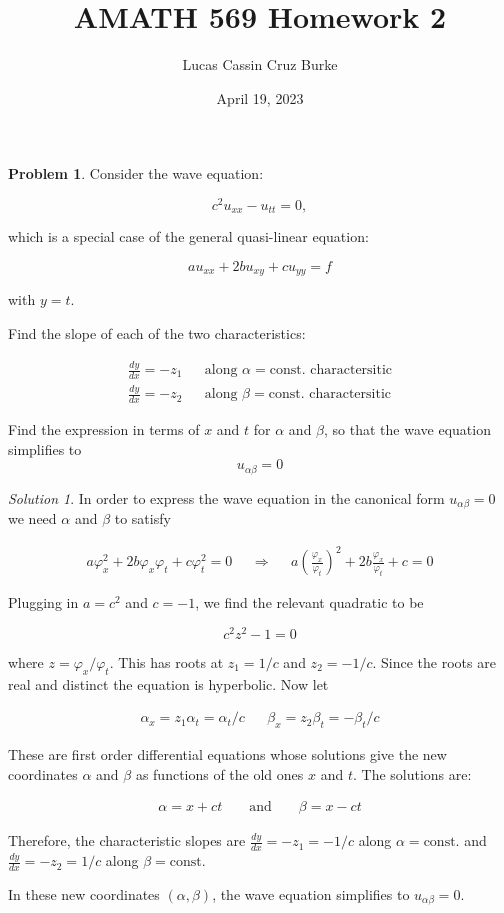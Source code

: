 \documentclass[12pt,a4paper]{article}
\title{AMATH 569 Homework 2}
\author{Lucas Cassin Cruz Burke}
\date{April 19, 2023}
\theoremstyle{definition}
\newtheorem{problem}{Problem}
\theoremstyle{remark}
\newtheorem*{solution}{Solution}
\begin{document}
\maketitle

\begin{problem}
    Consider the wave equation: 
    
    $$c^2 u_{xx} - u_{tt} = 0,$$ 

    which is a special case of the general quasi-linear equation:

    $$au_{xx} + 2bu_{xy} + cu_{yy}=f$$

    with $y=t$. 

    Find the slope of each of the two characteristics:

    \begin{align*}
        \frac{dy}{dx} = -z_1 && \text{along } \alpha = \text{const.} \text{ charactersitic} \\
        \frac{dy}{dx} = -z_2 && \text{along } \beta = \text{const.} \text{ charactersitic}
    \end{align*}

    Find the expression in terms of $x$ and $t$ for $\alpha$ and $\beta$, so that the wave equation simplifies to $$u_{\alpha \beta} = 0$$
\end{problem}
\begin{solution}
    In order to express the wave equation in the canonical form $u_{\alpha \beta}=0$ we need $\alpha$ and $\beta$ to satisfy

    \begin{align*}
        a \varphi_x^2 + 2b \varphi_x\varphi_t + c \varphi_t^2 = 0 && \Rightarrow && a \left( \frac{\varphi_x}{\varphi_t} \right)^2 + 2b \frac{\varphi_x}{\varphi_t} + c = 0 
    \end{align*}

    Plugging in $a=c^2$ and $c=-1$, we find the relevant quadratic to be 

    $$c^2 z^2 -1 =0$$

    where $z= \varphi_x/\varphi_t$. This has roots at $z_1 = 1/c$ and $z_2=-1/c$. Since the roots are real and distinct the equation is hyperbolic. Now let 

    \begin{align*}
        \alpha_x = z_1 \alpha_t = \alpha_t/c && \beta_x = z_2 \beta_t = -\beta_t/c
    \end{align*}

    These are first order differential equations whose solutions give the new coordinates $\alpha$ and $\beta$ as functions of the old ones $x$ and $t$. The solutions are:

    \begin{align*}
    \alpha = x+ct && \text{ and } && \beta = x-ct
    \end{align*}
    
    Therefore, the characteristic slopes are $\frac{dy}{dx} = -z_1 = -1/c$ along $\alpha = \text{const.}$ and $\frac{dy}{dx} = -z_2 = 1/c$ along $\beta = \text{const.}$
    
    In these new coordinates $(\alpha, \beta)$, the wave equation simplifies to $u_{\alpha \beta} = 0$. 
\end{solution}
\end{document}
